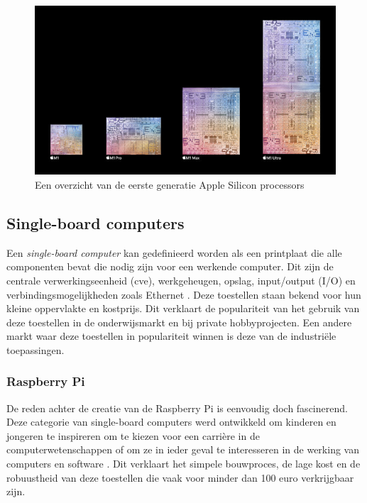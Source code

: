 \begin{figure}[!htb]
    \centering
    \includegraphics[width=\linewidth]{img/Apple-M1-chip-family-lineup.jpg}
    \caption{Een overzicht van de eerste generatie Apple Silicon processors \autocite{Apple2022}}
\end{figure}

\subsection{Single-board computers}
Een \textit{single-board computer} kan gedefinieerd worden als een printplaat die alle componenten bevat die nodig zijn voor een werkende computer. Dit zijn de centrale verwerkingseenheid (cve), werkgeheugen, opslag, input/output (I/O) en verbindingsmogelijkheden zoals Ethernet \autocite{Pcmag2022}. Deze toestellen staan bekend voor hun kleine oppervlakte en kostprijs. Dit verklaart de populariteit van het gebruik van deze toestellen in de onderwijsmarkt en bij private hobbyprojecten. Een andere markt waar deze toestellen in populariteit winnen is deze van de industriële toepassingen.

\subsubsection{Raspberry Pi}
De reden achter de creatie van de Raspberry Pi is eenvoudig doch fascinerend. Deze categorie van single-board computers werd ontwikkeld om kinderen en jongeren te inspireren om te kiezen voor een carrière in de computerwetenschappen of om ze in ieder geval te interesseren in de werking van computers en software \autocite{Severance2013}. Dit verklaart het simpele bouwproces, de lage kost en de robuustheid van deze toestellen die vaak voor minder dan 100 euro verkrijgbaar zijn. 


